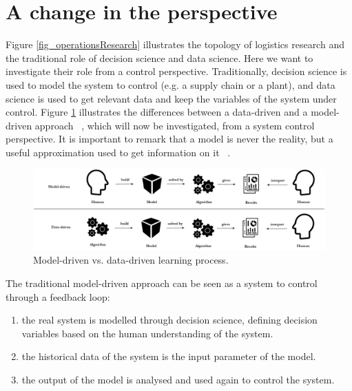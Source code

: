 \section{A change in the perspective}

Figure \ref{fig_operationsResearch} illustrates the topology of logistics research and the traditional role of decision science and data science. Here we want to investigate their role from a control perspective. Traditionally, decision science is used to model the system to control (e.g. a supply chain or a plant), and data science is used to get relevant data and keep the variables of the system under control. Figure \ref{fig_controlDataDriven} illustrates the differences between a data-driven and a model-driven approach ~\cite{Hedgebeth2007}, which will now be investigated, from a system control perspective. It is important to remark that a model is never the reality, but a useful approximation used to get information on it ~\cite{Hazen2014}.

\begin{figure}[hbt!]
\centering
\includegraphics[width=1\textwidth]{SectionIntroduction/introduction_figures/fig_controlDataDriven.png}
\captionsetup{type=figure}
\caption{Model-driven vs. data-driven learning process.}
\label{fig_controlDataDriven}
\end{figure}

The traditional model-driven approach can be seen as a system to control through a feedback loop:

\begin{enumerate}
    \item the real system is modelled through decision science, defining decision variables based on the human understanding of the system. 
    \item the historical data of the system is the input parameter of the model.
    \item the output of the model is analysed and used again to control the system.

\end{enumerate}

